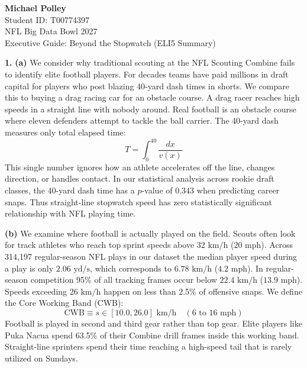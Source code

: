 \documentclass[11pt]{article}
\begin{document}
\begin{center}
    \vspace*{5cm}
    {\LARGE \textbf{Michael Polley}} \\[2em]
    \normalsize Student ID: T00774397 \\[2em]
    NFL Big Data Bowl 2027 \\[2em]
    Executive Guide: Beyond the Stopwatch (ELI5 Summary)
    \vfill
\end{center}
\thispagestyle{empty}
\newpage

\noindent\textbf{1.}
\noindent\textbf{(a)}
We consider why traditional scouting at the NFL Scouting Combine fails to identify elite football players. For decades teams have paid millions in draft capital for players who post blazing 40-yard dash times in shorts. We compare this to buying a drag racing car for an obstacle course. A drag racer reaches high speeds in a straight line with nobody around. Real football is an obstacle course where eleven defenders attempt to tackle the ball carrier. The 40-yard dash measures only total elapsed time:
\[ T = \int_{0}^{40} \frac{dx}{v(x)} \]
This single number ignores how an athlete accelerates off the line, changes direction, or handles contact. In our statistical analysis across rookie draft classes, the 40-yard dash time has a $p$-value of $0.343$ when predicting career snaps. Thus straight-line stopwatch speed has zero statistically significant relationship with NFL playing time.

\noindent\textbf{(b)}
We examine where football is actually played on the field. Scouts often look for track athletes who reach top sprint speeds above $32\text{ km/h}$ ($20\text{ mph}$). Across 314,197 regular-season NFL plays in our dataset the median player speed during a play is only $2.06\text{ yd/s}$, which corresponds to $6.78\text{ km/h}$ ($4.2\text{ mph}$). In regular-season competition 95\% of all tracking frames occur below $22.4\text{ km/h}$ ($13.9\text{ mph}$). Speeds exceeding $26\text{ km/h}$ happen on less than 2.5\% of offensive snaps. We define the Core Working Band (CWB):
\[ \text{CWB} \equiv s \in [10.0, 26.0]\text{ km/h} \quad (6\text{ to }16\text{ mph}) \]
Football is played in second and third gear rather than top gear. Elite players like Puka Nacua spend 63.5\% of their Combine drill frames inside this working band. Straight-line sprinters spend their time reaching a high-speed tail that is rarely utilized on Sundays.
\end{document}

